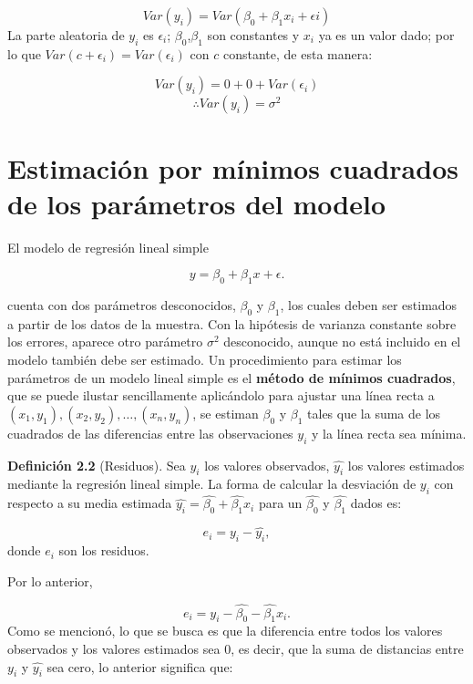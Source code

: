 \documentclass[
  a4paper,
  oneside,
  openany]{book}
\begin{document}
\[Var(y_{i})= Var(\beta_{0}+\beta_{1}x_{i}+\epsilon{i})\]
La parte aleatoria de \(y_{i}\) es \(\epsilon_{i}\); \(\beta_{0}\),\(\beta_{1}\) son constantes y \(x_{i}\) ya es un valor dado; por lo que \(Var(c+\epsilon_{i})=Var(\epsilon_{i})\) con \(c\) constante, de esta manera:

\[Var(y_{i})=0+0+Var(\epsilon_{i})\]
\[\therefore Var(y_{i})=\sigma^2\]

\hypertarget{estimaciuxf3n-por-muxednimos-cuadrados-de-los-paruxe1metros-del-modelo}{%
\section{Estimación por mínimos cuadrados de los parámetros del modelo}\label{estimaciuxf3n-por-muxednimos-cuadrados-de-los-paruxe1metros-del-modelo}}

El modelo de regresión lineal simple

\[y=\beta_{0}+\beta_{1}x+\epsilon.\]

cuenta con dos parámetros desconocidos, \(\beta_{0}\) y \(\beta_{1}\), los cuales deben ser estimados a partir de los datos de la muestra. Con la hipótesis de varianza constante sobre los errores, aparece otro parámetro \(\sigma^2\) desconocido, aunque no está incluido en el modelo también debe ser estimado.
Un procedimiento para estimar los parámetros de un modelo lineal simple es el \textbf{método de mínimos cuadrados}, que se puede ilustar sencillamente aplicándolo para ajustar una línea recta a \((x_{1},y_{1}),(x_{2},y_{2}),\ldots,(x_{n},y_{n})\), se estiman \(\beta_{0}\) y \(\beta_{1}\) tales que la suma de los cuadrados de las diferencias entre las observaciones \(y_{i}\) y la línea recta sea mínima.

\textbf{Definición 2.2} (Residuos). Sea \(y_{i}\) los valores observados, \(\hat{y_{i}}\) los valores estimados mediante la regresión lineal simple. La forma de calcular la desviación de \(y_{i}\) con respecto a su media estimada \(\hat{y_{i}}=\hat{\beta_{0}}+\hat{\beta_{1}}x_{i}\) para un \(\hat{\beta_{0}}\) y \(\hat{\beta_{1}}\) dados es:

\[e_{i}=y_{i}-\hat{y_{i}},\]
donde \(e_{i}\) son los residuos.

Por lo anterior,

\[e_{i}=y_{i}-\hat{\beta_{0}}-\hat{\beta_{1}}x_{i}.\]
Como se mencionó, lo que se busca es que la diferencia entre todos los valores observados y los valores estimados sea 0, es decir, que la suma de distancias entre \(y_{i}\) y \(\hat{y_{i}}\) sea cero, lo anterior significa que:
\end{document}
